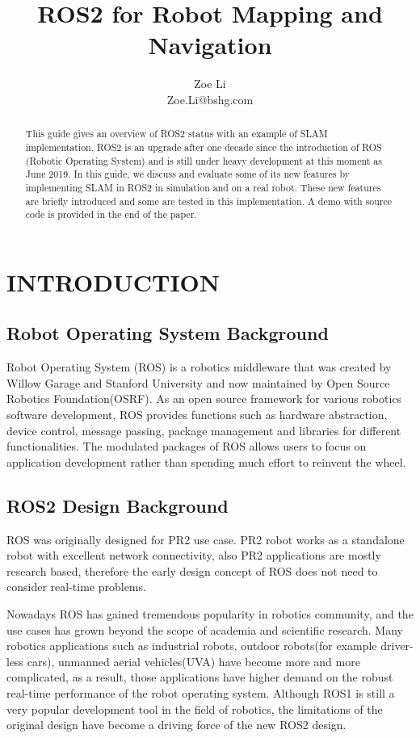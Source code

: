 \documentclass[letterpaper, 10 pt, conference]{ieeeconf}  %
\title{\LARGE \bf
ROS2 for Robot Mapping and Navigation
}
\author{Zoe Li \\
        Zoe.Li@bshg.com%
}
\begin{document}
\maketitle
\thispagestyle{empty}
\pagestyle{empty}
\begin{abstract}
 This guide gives an overview of ROS2 status with an example of SLAM implementation. ROS2 is an upgrade after one decade since the introduction of ROS (Robotic Operating System) and is still under heavy development at this moment as June 2019. In this guide, we discuss and evaluate some of its new features by implementing SLAM in ROS2 in simulation and on a real robot. These new features are briefly introduced and some are tested in this implementation. A demo with source code is provided in the end of the paper.
\end{abstract}
\section{INTRODUCTION}
\subsection{Robot Operating System Background}
Robot Operating System (ROS) is a robotics middleware that was created by Willow Garage and Stanford University and now maintained by Open Source Robotics Foundation(OSRF)\cite{c2}.  As an open source framework for various robotics software development, ROS provides functions such as hardware abstraction, device control, message passing, package management and libraries for different functionalities. The modulated packages of ROS allows users to focus on application development rather than spending much effort to reinvent the wheel.
\subsection{ROS2 Design Background}
ROS was originally designed for PR2 use case. PR2 robot works as a standalone robot with excellent network connectivity, also PR2 applications are mostly research based, therefore the early design concept of ROS does not need to consider real-time problems.

Nowadays ROS has gained tremendous popularity in robotics community, and the use cases has grown beyond the scope of academia and scientific research. Many robotics applications such as  industrial robots, outdoor robots(for example driver-less cars), unmanned aerial vehicles(UVA) have become more and more complicated, as a result, those applications have higher demand on the robust real-time performance of the robot operating system. Although ROS1 is still a very popular development tool in the field of robotics, the limitations of the original design have become a driving force of the new ROS2 design\cite{c3}. 
\end{document}
